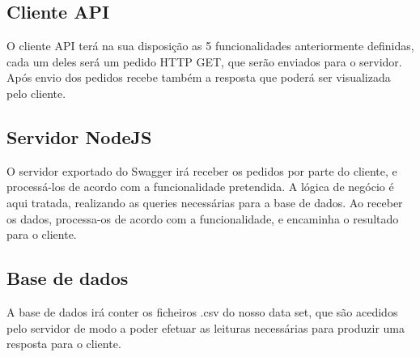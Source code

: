 \documentclass[runningheads]{llncs}
\begin{document}
\subsection{Cliente API}
O cliente API terá na sua disposição as 5 funcionalidades anteriormente definidas, cada um deles será um pedido HTTP GET, que serão enviados para o servidor. Após envio dos pedidos recebe também a resposta que poderá ser visualizada pelo cliente.

\subsection{Servidor NodeJS}
O servidor exportado do Swagger irá receber os pedidos por parte do cliente, e processá-los de acordo com a funcionalidade pretendida. A lógica de negócio é aqui tratada, realizando as queries necessárias para a base de dados. Ao receber os dados, processa-os de acordo com a funcionalidade, e encaminha o resultado para o cliente.

\subsection{Base de dados}
A base de dados irá conter os ficheiros .csv do nosso data set, que são acedidos pelo servidor de modo a poder efetuar as leituras necessárias para produzir uma resposta para o cliente.
\end{document}
